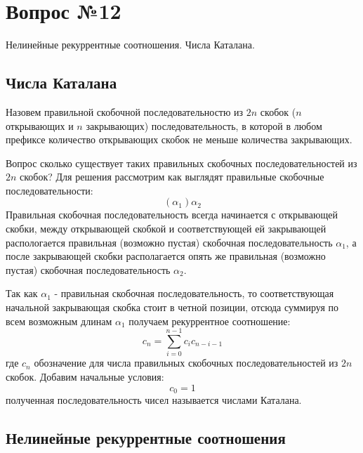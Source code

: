 \chapter{Вопрос №12}

Нелинейные рекуррентные соотношения. Числа Каталана.

\section{Числа Каталана}

Назовем правильной скобочной последовательностю из $2n$ скобок ($n$ открывающих и $n$ закрывающих) последовательность, в которой в любом префиксе количество открывающих скобок не меньше количества закрывающих.

Вопрос сколько существует таких правильных скобочных последовательностей из $2n$ скобок? Для решения рассмотрим как выглядят правильные скобочные последовательности: $$ \left( \alpha_1 \right) \alpha_2 $$
Правильная скобочная последовательность всегда начинается с открывающей скобки, между открывающей скобкой и соответствующей ей закрывающей распологается правильная (возможно пустая) скобочная последовательность $\alpha_1$, а после закрывающей скобки располагается опять же правильная (возможно пустая) скобочная последовательность $\alpha_2$.

Так как $\alpha_1$ - правильная скобочная последовательность, то соответствующая начальной закрывающая скобка стоит в четной позиции, отсюда суммируя по всем возможным длинам $\alpha_1$ получаем рекуррентное соотношение:
\begin{equation}
	c_n = \sum_{i=0}^{n-1}c_ic_{n-i-1}
\end{equation}
где $ c_n $ обозначение для числа правильных скобочных последовательностей из $2n$ скобок. Добавим начальные условия:
\[
	c_0 = 1
\]
полученная последовательность чисел называется числами Каталана.

\section{Нелинейные рекуррентные соотношения}

